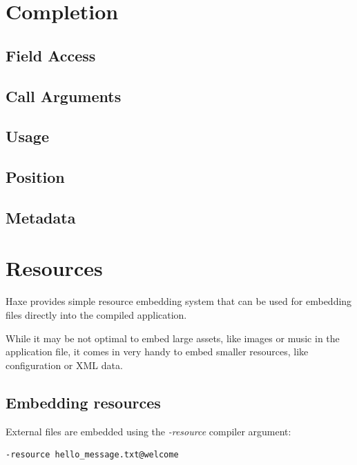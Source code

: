 \documentclass{haxe}
\begin{document}
\section{Completion}
\label{cr-completion}

\subsection{Field Access}
\label{Field access}

\subsection{Call Arguments}
\label{Call arguments}

\subsection{Usage}
\label{usage}

\subsection{Position}
\label{position}

\subsection{Metadata}
\label{metadata}

\section{Resources}
\label{cr-resources}

Haxe provides simple resource embedding system that can be used for embedding  files directly into the compiled application.

While it may be not optimal to embed large assets, like images or music in the application file, it comes in very handy to embed smaller resources, like configuration or XML data.

\subsection{Embedding resources}
\label{cr-resources-embed}

External files are embedded using the \emph{-resource} compiler argument:

\begin{lstlisting}
-resource hello_message.txt@welcome
\end{lstlisting}
\end{document}
